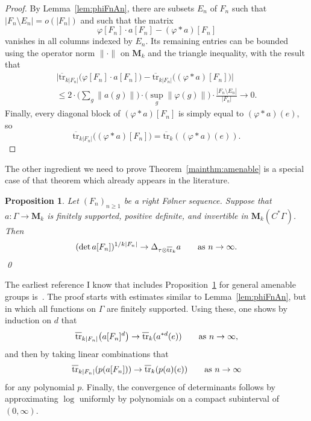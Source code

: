 \documentclass[12pt,a4paper]{article}
\numberwithin{equation}{section}
\newtheorem{prop}[thm]{Proposition}
\theoremstyle{remark}
\newcommand{\rmM}{\mathbf{M}}
\newcommand{\G}{\Gamma}
\renewcommand{\phi}{\varphi}
\newcommand{\tr}{\overline{\mathrm{tr}}}
\begin{document}
\begin{proof}
By Lemma~\ref{lem:phiFnAn}, there are subsets $E_n$ of $F_n$ such that $|F_n\setminus E_n| = o(|F_n|)$ and such that the matrix
\[\phi[F_n]\cdot a[F_n] - (\phi\ast a)[F_n]\]
vanishes in all columns indexed by $E_n$.  Its remaining entries can be bounded using the operator norm $\|\cdot\|$ on $\rmM_k$ and the triangle inequality, with the result that
\begin{multline*}
\big|\tr_{k|F_n|}\big(\phi[F_n]\cdot a[F_n]\big) - \tr_{k|F_n|}\big((\phi\ast a)[F_n])\big| \\ \le 2\cdot \Big(\sum_g\|a(g)\|\Big)\cdot \Big(\sup_g\|\phi(g)\|\Big)\cdot \frac{|F_n\setminus E_n|}{|F_n|} \to 0.
\end{multline*}
Finally, every diagonal block of $(\phi\ast a)[F_n]$ is simply equal to $(\phi\ast a)(e)$, so
\[\tr_{k|F_n|}\big((\phi\ast a)[F_n]) = \tr_k((\phi\ast a)(e)).\]
\end{proof}

The other ingredient we need to prove Theorem~\ref{mainthm:amenable} is a special case of that theorem which already appears in the literature.

\begin{prop}\label{prop:Den}
Let $(F_n)_{n\ge 1}$ be a right F\o lner sequence.  Suppose that ${a:\G\to\rmM_k}$ is finitely supported, positive definite, and invertible in $\rmM_k(C^\ast \G)$.  Then
\[(\det a[F_n])^{1/k|F_n|} \to \Delta_{\tau \otimes \tr_k} a \qquad \hbox{as}\ n\to\infty.\]
\qed
\end{prop}

The earliest reference I know that includes Proposition~\ref{prop:Den} for general amenable groups is~\cite[Thm. 3.2]{Den06}.  The proof starts with estimates similar to Lemma~\ref{lem:phiFnAn}, but in which all functions on $\G$ are finitely supported.  Using these, one shows by induction on $d$ that
\[\tr_{k|F_n|}\big(a[F_n]^d\big) \to \tr_k(a^{\ast d}(e)) \qquad \hbox{as}\ n\to\infty,\]
and then by taking linear combinations that
\[\tr_{k|F_n|}(p(a[F_n])) \to \tr_k(p(a)(e)) \qquad \hbox{as}\ n\to\infty\]
for any polynomial $p$.  Finally, the convergence of determinants follows by approximating $\log$ uniformly by polynomials on a compact subinterval of $(0,\infty)$.
\end{document}
